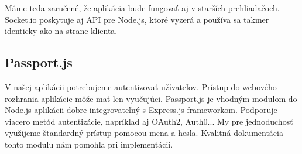 Máme teda zaručené, že aplikácia bude fungovať aj v starších prehliadačoch. Socket.io
poskytuje aj API pre Node.js, ktoré vyzerá a používa sa takmer identicky ako na strane
klienta.~\cite{bib:raisocketio,bib:walshwebsocket}

\subsection{Passport.js}
\label{sec:nodejs:passportjs}

V našej aplikácii potrebujeme autentizovať užívateľov. Prístup do webového
rozhrania aplikácie môže mať len vyučujúci. Passport.js je vhodným modulom
do Node.js aplikácii dobre integrovateľný s Express.js frameworkom.
Podporuje viacero metód autentizácie, napríklad aj OAuth2, Auth0...
My pre jednoduchosť využijeme štandardný prístup pomocou mena a hesla.
Kvalitná dokumentácia~\cite{bib:passportjsdocs} tohto modulu nám pomohla pri
implementácii.